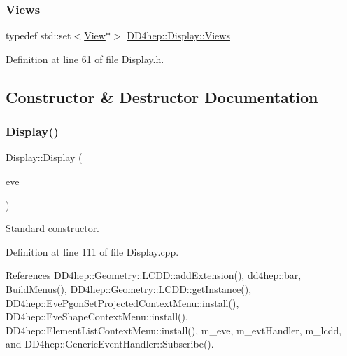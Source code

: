 \subsubsection{\texorpdfstring{Views}{Views}}
{\footnotesize\ttfamily typedef std\+::set$<$\hyperlink{class_d_d4hep_1_1_view}{View}$\ast$$>$ \hyperlink{class_d_d4hep_1_1_display_a93fcdf6ec0390291e26d59d0d78cd6e8}{D\+D4hep\+::\+Display\+::\+Views}}



Definition at line 61 of file Display.\+h.



\subsection{Constructor \& Destructor Documentation}
\hypertarget{class_d_d4hep_1_1_display_a9038e67619d22b62a928fa32d912ea10}{}\label{class_d_d4hep_1_1_display_a9038e67619d22b62a928fa32d912ea10} 
\subsubsection{\texorpdfstring{Display()}{Display()}}
{\footnotesize\ttfamily Display\+::\+Display (\begin{DoxyParamCaption}\item[{T\+Eve\+Manager $\ast$}]{eve }\end{DoxyParamCaption})}



Standard constructor. 



Definition at line 111 of file Display.\+cpp.



References D\+D4hep\+::\+Geometry\+::\+L\+C\+D\+D\+::add\+Extension(), dd4hep\+::bar, Build\+Menus(), D\+D4hep\+::\+Geometry\+::\+L\+C\+D\+D\+::get\+Instance(), D\+D4hep\+::\+Eve\+Pgon\+Set\+Projected\+Context\+Menu\+::install(), D\+D4hep\+::\+Eve\+Shape\+Context\+Menu\+::install(), D\+D4hep\+::\+Element\+List\+Context\+Menu\+::install(), m\+\_\+eve, m\+\_\+evt\+Handler, m\+\_\+lcdd, and D\+D4hep\+::\+Generic\+Event\+Handler\+::\+Subscribe().

\hypertarget{class_d_d4hep_1_1_display_ac2607a6bb236c55547a4223d40d85d1f}{}\label{class_d_d4hep_1_1_display_ac2607a6bb236c55547a4223d40d85d1f} 
